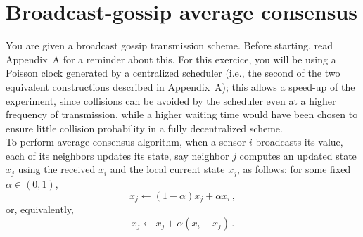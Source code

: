 \documentclass{article}
\begin{document}
%



\section{Broadcast-gossip average consensus}
You are given a broadcast gossip transmission scheme. Before starting, read Appendix~A for a reminder about this.
For this exercice, you will be using a Poisson clock generated by a centralized scheduler (i.e., the second of the two equivalent constructions described in Appendix~A); this allows a speed-up of the experiment, since collisions can be avoided by the scheduler even at a higher frequency of transmission, while a higher waiting time would have been chosen to ensure little collision probability in a fully decentralized scheme.\\

To perform average-consensus algorithm, when a sensor $i$ broadcasts its value, each of its neighbors updates its state, say neighbor $j$ computes an updated state $x_j$ using the received $x_i$ and the local current state $x_j$, as follows:
 for some fixed $\alpha \in (0,1)$,
\[ x_j  \leftarrow (1- \alpha) x_j + \alpha x_i \,,\]
 or, equivalently,
\[ x_j \leftarrow x_j + \alpha (x_i-x_j) \,.\]
\end{document}
